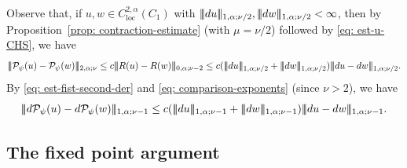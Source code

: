 \documentclass[11pt]{amsart}
\DeclarePairedDelimiter{\tnorm}{\vert\!\vert\!\vert}{\vert\!\vert\!\vert}
\theoremstyle{definition}
\theoremstyle{remark}
\begin{document}
Observe that, if $u,w\in C^{2,\alpha}_{\text{loc}}(C_{1})$ with $\tnorm{du}_{1,\alpha;\nu/2},\tnorm{dw}_{1,\alpha;\nu/2}<\infty$, then by
Proposition~\ref{prop: contraction-estimate} (with $\mu=\nu/2$) followed by \eqref{eq: est-u-CHS}, we have 
\begin{equation*}
\tnorm{\mathcal{P}_\psi(u)-\mathcal{P}_\psi(w)}_{2,\alpha; \nu}
\le c\tnorm{R(u)-R(w)}_{0,\alpha; \nu-2}
\le c(\tnorm {du}_{1,\alpha;\nu/2}+\tnorm{dw}_{1,\alpha;\nu/2})\tnorm{du-dw}_{1,\alpha;\nu/2}.
\end{equation*}
By \eqref{eq: est-fist-second-der} and \eqref{eq: comparison-exponents} (since $\nu > 2$), we have
\begin{equation}\label{eq:du-est}
\tnorm{d\mathcal{P}_\psi(u)-d\mathcal{P}_\psi(w)}_{1,\alpha;\nu-1}
\le c(\tnorm {du}_{1,\alpha;\nu-1}+\tnorm{dw}_{1,\alpha;\nu-1})\tnorm{du-dw}_{1,\alpha;\nu-1}.
\end{equation}

\subsection{The fixed point argument}\label{ssec: fixed-point-argument}
\end{document}

